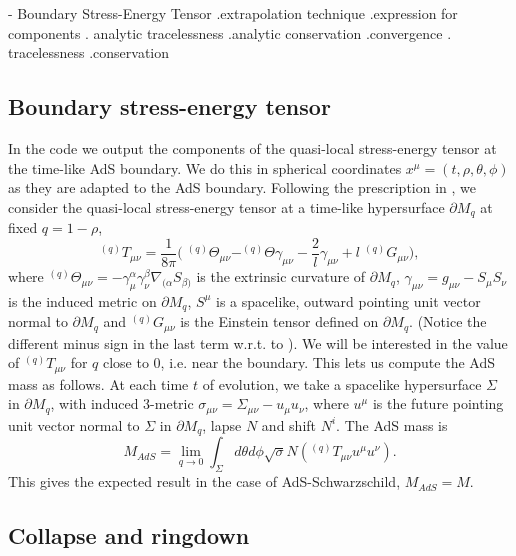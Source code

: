 \documentclass[12pt]{iopart}
\begin{document}
- Boundary Stress-Energy Tensor .extrapolation technique .expression for components . analytic tracelessness .analytic conservation .convergence . tracelessness .conservation

\subsection{Boundary stress-energy tensor}
\label{sec:bouset}

In the code we output the components of the quasi-local stress-energy tensor at the time-like AdS boundary. We do this in spherical coordinates $x^\mu=(t,\rho,\theta,\phi)$ as they are adapted to the AdS boundary. Following the prescription in  \cite{AdSmass}, we consider the quasi-local stress-energy tensor at a time-like hypersurface $\partial M_q$ at fixed $q=1-\rho$,
\begin{equation}
^{(q)}T_{\mu\nu}=\frac{1}{8\pi}\biggl(\;   ^{(q)}\Theta_{\mu\nu}-^{(q)}\Theta \gamma_{\mu\nu}-\frac{2}{l}\gamma_{\mu\nu}+l \;^{(q)}G_{\mu\nu} \biggr),
\end{equation}
where $^{(q)}\Theta_{\mu\nu}=-\gamma^\alpha_{\mu}\gamma^\beta_\nu\nabla_{(\alpha}S_{\beta)}$ is the extrinsic curvature of $\partial M_q$, $\gamma_{\mu\nu}=g_{\mu\nu}-S_\mu S_\nu$ is the induced metric on $\partial M_q$, $S^\mu$ is a spacelike, outward pointing unit vector normal to $\partial M_q$ and $^{(q)}G_{\mu\nu}$ is the Einstein tensor defined on $\partial M_q$. (Notice the different minus sign in the last term w.r.t. to \cite{AdSmass} ). We will be interested in the value of $^{(q)}T_{\mu\nu}$ for $q$ close to 0, i.e. near the boundary.
This lets us compute the AdS mass as follows. At each time $t$ of evolution, we take a spacelike hypersurface $\Sigma$ in $\partial M_q$, with induced 3-metric $\sigma_{\mu\nu}=\Sigma_{\mu\nu}-u_\mu u_\nu$, where $u^\mu$ is the future pointing unit vector normal to $\Sigma$ in $\partial M_q$, lapse $N$ and shift $N^i$. The AdS mass is
\begin{equation}
M_{AdS}=\lim_{q\to0}\int_\Sigma d\theta d\phi \sqrt{\sigma} N ( ^{(q)}T_{\mu\nu} u^\mu u^\nu).
\end{equation}
This gives the expected result in the case of AdS-Schwarzschild, $M_{AdS}=M$.

\subsection{Collapse and ringdown}\label{sec:results}
\end{document}
